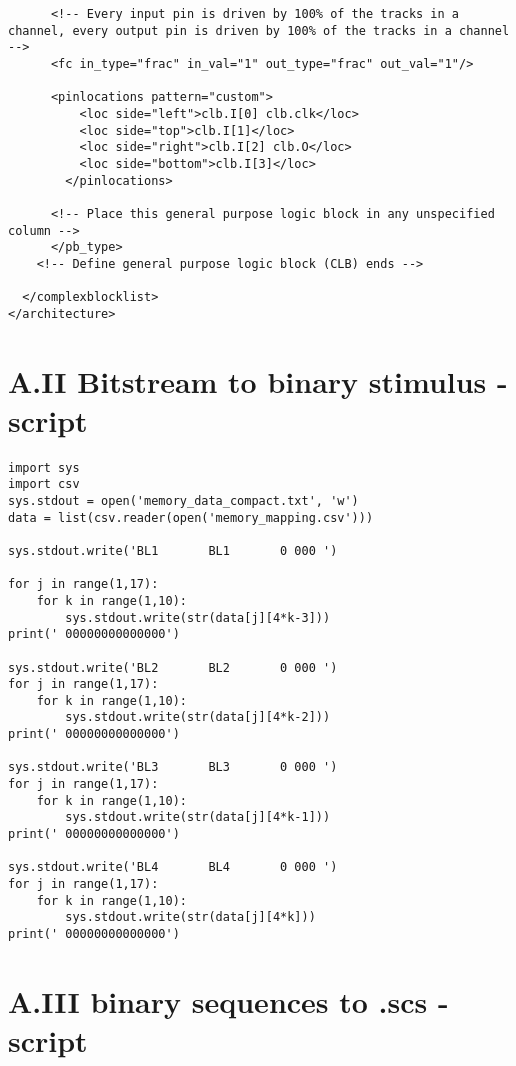 \begin{lstlisting}
      <!-- Every input pin is driven by 100% of the tracks in a channel, every output pin is driven by 100% of the tracks in a channel -->
      <fc in_type="frac" in_val="1" out_type="frac" out_val="1"/>

      <pinlocations pattern="custom">
          <loc side="left">clb.I[0] clb.clk</loc> 
          <loc side="top">clb.I[1]</loc> 
          <loc side="right">clb.I[2] clb.O</loc> 
          <loc side="bottom">clb.I[3]</loc>     
        </pinlocations>

      <!-- Place this general purpose logic block in any unspecified column -->
      </pb_type>
    <!-- Define general purpose logic block (CLB) ends -->

  </complexblocklist>
</architecture>
\end{lstlisting}


\section{A.II \qquad Bitstream to binary stimulus - script}

\paragraph{}
\begin{lstlisting}
import sys
import csv
sys.stdout = open('memory_data_compact.txt', 'w')
data = list(csv.reader(open('memory_mapping.csv')))

sys.stdout.write('BL1       BL1       0 000 ')

for j in range(1,17):
	for k in range(1,10):
		sys.stdout.write(str(data[j][4*k-3]))
print(' 00000000000000')

sys.stdout.write('BL2       BL2       0 000 ')
for j in range(1,17):
	for k in range(1,10):
		sys.stdout.write(str(data[j][4*k-2]))
print(' 00000000000000')

sys.stdout.write('BL3       BL3       0 000 ')
for j in range(1,17):
	for k in range(1,10):
		sys.stdout.write(str(data[j][4*k-1]))
print(' 00000000000000')

sys.stdout.write('BL4       BL4       0 000 ')
for j in range(1,17):
	for k in range(1,10):
		sys.stdout.write(str(data[j][4*k]))
print(' 00000000000000')

\end{lstlisting}

\section{A.III \qquad binary sequences to .scs - script }

